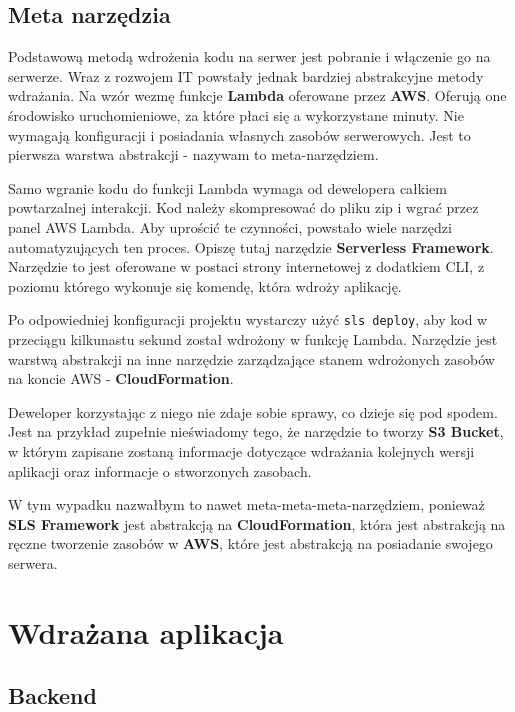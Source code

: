 \documentclass{article}
\begin{document}
\subsection{Meta narzędzia} \label{subsectionMetaNarzedzia}

Podstawową metodą wdrożenia kodu na serwer jest pobranie i włączenie go na serwerze. Wraz z rozwojem IT powstały jednak bardziej abstrakcyjne metody wdrażania. Na wzór wezmę funkcje \textbf{Lambda} oferowane przez \textbf{AWS}. Oferują one środowisko uruchomieniowe, za które płaci się a wykorzystane minuty. Nie wymagają konfiguracji i posiadania własnych zasobów serwerowych. Jest to pierwsza warstwa abstrakcji - nazywam to meta-narzędziem.

Samo wgranie kodu do funkcji Lambda wymaga od dewelopera całkiem powtarzalnej interakcji. Kod należy skompresować do pliku zip i wgrać przez panel AWS Lambda. Aby uprościć te czynności, powstało wiele narzędzi automatyzujących ten proces. Opiszę tutaj narzędzie \textbf{Serverless Framework}. Narzędzie to jest oferowane w postaci strony internetowej z dodatkiem CLI, z poziomu którego wykonuje się komendę, która wdroży aplikację.

Po odpowiedniej konfiguracji projektu wystarczy użyć \lstinline|sls deploy|, aby kod w przeciągu kilkunastu sekund został wdrożony w funkcję Lambda. Narzędzie jest warstwą abstrakcji na inne narzędzie zarządzające stanem wdrożonych zasobów na koncie AWS - \textbf{CloudFormation}.

Deweloper korzystając z niego nie zdaje sobie sprawy, co dzieje się pod spodem. Jest na przykład zupełnie nieświadomy tego, że narzędzie to tworzy \textbf{S3 Bucket}, w którym zapisane zostaną informacje dotyczące wdrażania kolejnych wersji aplikacji oraz informacje o stworzonych zasobach.

W tym wypadku nazwałbym to nawet meta-meta-meta-narzędziem, ponieważ \textbf{SLS Framework} jest abstrakcją na \textbf{CloudFormation}, która jest abstrakcją na ręczne tworzenie zasobów w \textbf{AWS}, które jest abstrakcją na posiadanie swojego serwera.

\section{Wdrażana aplikacja}

\subsection{Backend}
\end{document}
